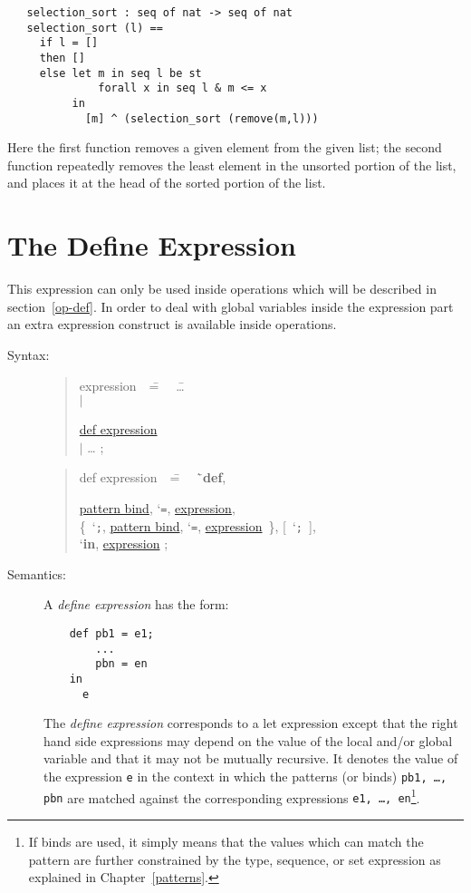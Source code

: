 \documentclass{overturerepchap}
\newcommand{\Lit}[1]{`{\tt #1}\Quote}
\newcommand{\Rule}[2]{
  \begin{quote}\begin{tabbing}
    #1\index{#1}\ \ \= = \ \ \= #2  ; %

  \end{tabbing}\end{quote}
  }
\newcommand{\Ruleref}[1]{
  \hyperlink{rule:#1}{#1}}
\newcommand{\SeqPt}[1]{\{\ #1\ \}}
\newcommand{\lfeed}{\\ \> \>}
\newcommand{\dsep}{\\ \> $|$ \>}
\newcommand{\Lop}[1]{`{\bf\ttfamily #1}\Quote}
\newcommand{\OptPt}[1]{[\ #1\ ]}
\begin{document}
{\begin{description}
\begin{lstlisting}
   selection_sort : seq of nat -> seq of nat
   selection_sort (l) ==
     if l = []
     then []
     else let m in seq l be st
              forall x in seq l & m <= x
          in
            [m] ^ (selection_sort (remove(m,l)))
   \end{lstlisting}
\label{selectionSortdef}
   Here the first function removes a given element from the given
   list; the second function repeatedly removes the least element in
   the unsorted portion of the list, and places it at the head of the
   sorted portion of the list.
\end{description}

\section{The Define Expression} \label{define-exp}

This expression can only be used inside operations which will be
described in section~\ref{op-def}. In order to deal with global variables
inside the expression part an extra expression construct is available
inside operations.

\begin{description}
\item[Syntax:]
  \Rule{expression}{
    \ldots \dsep
    \Ruleref{def expression} \dsep
    \ldots
    }

\Rule{def expression}{
  \Lop{def},
  \Ruleref{pattern bind}, \Lit{=}, \Ruleref{expression}, \lfeed
  \SeqPt{\Lit{;}, \Ruleref{pattern bind}, \Lit{=}, \Ruleref{expression}}, \OptPt{\Lit{;}},
  \lfeed
  \Lop{in}, \Ruleref{expression}
  }

\item[Semantics:] A {\it define expression} has the form:
  \begin{lstlisting}
    def pb1 = e1;
        ...
        pbn = en
    in
      e
  \end{lstlisting}
  The {\it define expression} corresponds to a let expression except
  that the right hand side expressions may depend on the value of the
  local and/or
  global variable and that it may not be mutually recursive.
  It denotes the value of the expression {\tt e} in the
  context in which the patterns (or binds) {\tt pb1, \ldots, pbn} are
  matched against the corresponding expressions {\tt e1, \ldots,
    en}\footnote{If binds are used, it simply means that the values
    which can match the pattern are further constrained by the type, sequence, or
    set expression as explained in Chapter~\ref{patterns}.}.


\end{description}}
\end{document}
